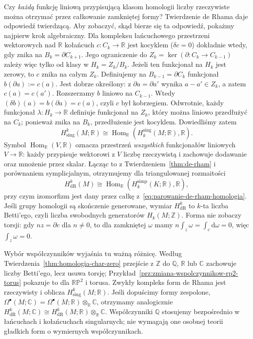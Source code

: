\documentclass[11pt,a4paper,oneside]{report}
\newcommand{\R}{\mathbb{R}}
\newcommand{\C}{\mathbb{C}}
\newcommand{\Z}{\mathbb{Z}}
\newcommand{\Q}{\mathbb{Q}}
\newcommand{\dd}{\mathrm d}
\theoremstyle{plain}
\theoremstyle{definition}
\theoremstyle{remark}
\begin{document}
Czy \emph{każdą} funkcję liniową przypisującą
klasom homologii liczby rzeczywiste można
otrzymać przez całkowanie zamkniętej formy?
Twierdzenie de Rhama daje odpowiedź twierdzącą.
Aby zobaczyć, skąd bierze się ta odpowiedź,
pokażmy najpierw krok algebraiczny.
Dla kompleksu
łańcuchowego przestrzeni wektorowych nad $\R$
kołańcuch $c:C_k\to\R$ jest kocyklem
($\delta c=0$) dokładnie wtedy, gdy znika
na $B_k=\partial C_{k+1}$. Jego ograniczenie
do $Z_k=\ker(\partial:C_k\to C_{k-1})$ zależy
więc tylko od klasy w $H_k=Z_k/B_k$.
Jeżeli ten funkcjonał na $H_k$ jest zerowy,
to $c$ znika na całym $Z_k$. Definiujemy
na $B_{k-1}=\partial C_k$ funkcjonał
$b(\partial a):=c(a)$. Jest dobrze określony:
z $\partial a=\partial a'$ wynika
$a-a'\in Z_k$, a zatem $c(a)=c(a')$.
Rozszerzamy $b$ liniowo na $C_{k-1}$.
Wtedy $(\delta b)(a)=b(\partial a)=c(a)$,
czyli $c$ był kobrzegiem. Odwrotnie, każdy
funkcjonał $\lambda:H_k\to\R$ definiuje
funkcjonał na $Z_k$, który można liniowo
przedłużyć na $C_k$; ponieważ znika na
$B_k$, przedłużenie jest kocyklem.
Dowiedliśmy zatem
\[
 H^k_{\mathrm{sing}}(M;\R)
 \cong \operatorname{Hom}_{\R}
       (H_k^{\mathrm{sing}}(M;\R),\R).
\]
Symbol $\operatorname{Hom}_{\R}(V,\R)$ oznacza
przestrzeń \emph{wszystkich} funkcjonałów liniowych
$V\to\R$: każdy przypisuje wektorowi z $V$
liczbę rzeczywistą i zachowuje dodawanie
oraz mnożenie przez skalar.
Łącząc to z Twierdzeniem~\ref{thm:de-rham}
i porównaniem symplicjalnym, otrzymujemy
dla triangulowanej rozmaitości
\begin{equation}\label{eq:porownanie-simp-de-rham}
 H^k_{\mathrm{dR}}(M)
 \cong \operatorname{Hom}_{\R}
       (H_k^{\mathrm{simp}}(K;\R),\R),
\end{equation}
przy czym izomorfizm jest dany przez całkę
z~\eqref{eq:parowanie-de-rham-homologia}.
Jeśli grupy homologii są skończenie generowane,
wymiar $H^k_{\mathrm{dR}}$ to $k$-ta liczba
Betti'ego, czyli liczba swobodnych generatorów
$H_k(M;\Z)$. Forma nie zobaczy torsji: gdy
$nz=\partial c$ dla $n\ne0$, to dla zamkniętej
$\omega$ mamy
$n\int_z\omega=\int_c\dd\omega=0$,
więc $\int_z\omega=0$.

Wybór współczynników wyjaśnia tu ważną różnicę.
Według Twierdzenia~\ref{thm:homologia-char-zero}
przejście z $\Z$ do $\Q$, $\R$ lub $\C$
zachowuje liczby Betti'ego, lecz usuwa torsję;
Przykład~\ref{prz:zmiana-wspolczynnikow-rp2-torus}
pokazuje to dla $\mathbb{RP}^2$ i torusa.
Zwykły kompleks form de Rhama jest rzeczywisty
i oblicza $H^k_{\mathrm{sing}}(M;\R)$.
Jeśli dopuścimy formy zespolone,
$\Omega^\bullet(M;\C)
=\Omega^\bullet(M;\R)\otimes_{\R}\C$,
otrzymamy analogicznie
$H^k_{\mathrm{dR}}(M;\C)
\cong H^k_{\mathrm{dR}}(M;\R)\otimes_{\R}\C$.
Współczynniki $\Q$ stosujemy bezpośrednio
w łańcuchach i kołańcuchach singularnych;
nie wymagają one osobnej teorii gładkich
form o wymiernych współczynnikach.
\end{document}
